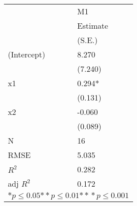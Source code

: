 \begin{tabular}{*{2}{l}}
\hline
                  & M1   \tabularnewline
                   &Estimate \tabularnewline
                 &(S.E.) \tabularnewline
 \hline
 \hline
   (Intercept)     &8.270 \tabularnewline
                 &(7.240)  \tabularnewline
   x1              &0.294* \tabularnewline
                 &(0.131)  \tabularnewline
   x2              &-0.060 \tabularnewline
                 &(0.089)  \tabularnewline
 \hline
 N                 &16       \tabularnewline
 RMSE             &5.035   \tabularnewline
 $R^2$             &0.282   \tabularnewline
 adj $R^2$         &0.172   \tabularnewline
 \hline
\hline
 
 \multicolumn{2}{c}{${*  p}\le 0.05$${*\!\!*  p}\le 0.01$${*\!\!*\!\!*  p}\le 0.001$}\tabularnewline
 \end{tabular}
